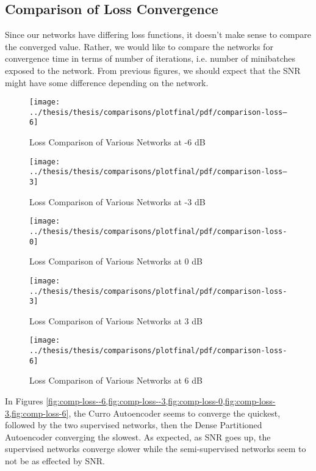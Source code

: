 \subsection{Comparison of Loss Convergence}

Since our networks have differing loss functions, it doesn't make sense to compare the converged value. Rather, we would like to compare the networks for convergence time in terms of number of iterations, i.e. number of minibatches exposed to the network. From previous figures, we should expect that the SNR might have some difference depending on the network.

\begin{figure}[!ht]
\centering
\texttt{[image: ../thesis/thesis/comparisons/plotfinal/pdf/comparison-loss--6]}
\caption{Loss Comparison of Various Networks at -6 dB}\label{fig:comp-loss--6}
\end{figure}

\begin{figure}[!ht]
\centering
\texttt{[image: ../thesis/thesis/comparisons/plotfinal/pdf/comparison-loss--3]}
\caption{Loss Comparison of Various Networks at -3 dB}\label{fig:comp-loss--3}
\end{figure}

\begin{figure}[!ht]
\centering
\texttt{[image: ../thesis/thesis/comparisons/plotfinal/pdf/comparison-loss-0]}
\caption{Loss Comparison of Various Networks at 0 dB}\label{fig:comp-loss-0}
\end{figure}

\begin{figure}[!ht]
\centering
\texttt{[image: ../thesis/thesis/comparisons/plotfinal/pdf/comparison-loss-3]}
\caption{Loss Comparison of Various Networks at 3 dB}\label{fig:comp-loss-3}
\end{figure}

\begin{figure}[!ht]
\centering
\texttt{[image: ../thesis/thesis/comparisons/plotfinal/pdf/comparison-loss-6]}
\caption{Loss Comparison of Various Networks at 6 dB}\label{fig:comp-loss-6}
\end{figure}

In Figures \cref{fig:comp-loss--6,fig:comp-loss--3,fig:comp-loss-0,fig:comp-loss-3,fig:comp-loss-6}, the Curro Autoencoder seems to converge the quickest, followed by the two supervised networks, then the Dense Partitioned Autoencoder converging the slowest. As expected, as SNR goes up, the supervised networks converge slower while the semi-supervised networks seem to not be as effected by SNR.


